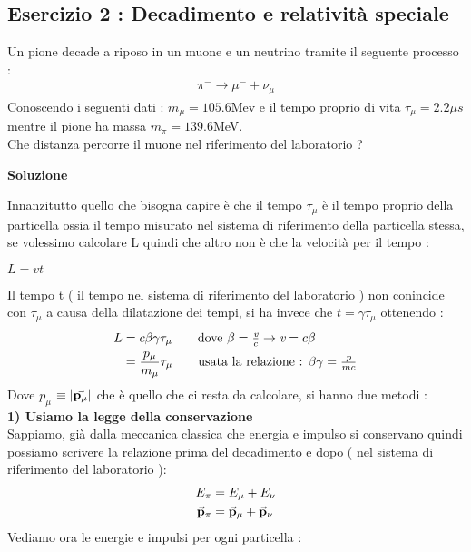 \subsection{Esercizio 2 : Decadimento e relatività speciale}
Un pione decade a riposo in un muone e un neutrino tramite il seguente processo : 
\begin{align*}
    \pi^{-} \rightarrow \mu^{-} + \nu_{\mu}
\end{align*}
Conoscendo i seguenti dati : $m_{\mu} = 105.6$Mev e il tempo proprio di vita $\tau_{\mu} = 2.2\mu s$ mentre il 
pione ha massa $m_{\pi} = 139.6$MeV.\\ 
Che distanza percorre il muone nel riferimento del laboratorio ? \\
\begin{center}{\textbf{Soluzione}}\end{center}
Innanzitutto quello che bisogna capire è che il tempo $\tau_{\mu}$ è il tempo proprio della particella ossia il tempo 
misurato nel sistema di riferimento della particella stessa, se volessimo calcolare L quindi che altro non è che la 
velocità per il tempo :\\
\begin{center} $L = \textit{v}t$\end{center}
Il tempo t ( il tempo nel sistema di riferimento del laboratorio ) non conincide con $\tau_{\mu}$ a causa della dilatazione dei tempi, 
si ha invece che $t=\gamma\tau_{\mu}$ ottenendo : 
\begin{align*}
        L &= c\beta\gamma\tau_{\mu}  \tag*{dove $\beta = \frac{\textit{v}}{c} \rightarrow \textit{v} = c\beta$} \\
          &= \frac{\textit{$p_{\mu}$}}{m_{\mu}}\tau_{\mu} \tag*{usata la relazione : $\beta\gamma = \frac{\textit{p}}{mc}$}
\end{align*}
Dove \textit{$p_{\mu}$} $\equiv \abs{\va{p_{\mu}}}$ che è quello che ci resta da calcolare, si hanno due metodi : \\
\textbf{1) Usiamo la legge della conservazione} \\
Sappiamo, già dalla meccanica classica che energia e impulso si conservano quindi possiamo scrivere la relazione prima del decadimento
e dopo ( nel sistema di riferimento del laboratorio ): 
\begin{align*}
        E_{\pi} &= E_{\mu} + E_{\nu} \\
        \va{p}_{\pi} &= \va{p}_{\mu} + \va{p}_{\nu}
\end{align*}
Vediamo ora le energie e impulsi per ogni particella : \\
